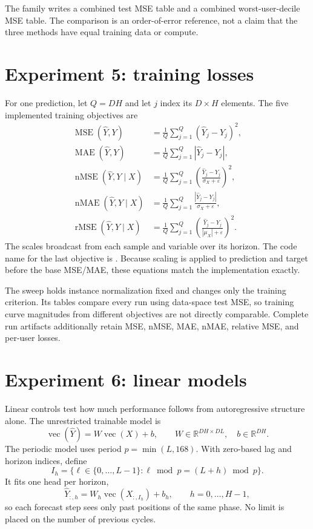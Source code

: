 \documentclass[10pt]{article}
\newcommand{\reals}{\mathbb{R}}
\newcommand{\code}[1]{\texttt{\detokenize{#1}}}
\newcommand{\MSE}{\operatorname{MSE}}
\newcommand{\MAE}{\operatorname{MAE}}
\newcommand{\nMSE}{\operatorname{nMSE}}
\newcommand{\nMAE}{\operatorname{nMAE}}
\newcommand{\rMSE}{\operatorname{rMSE}}
\begin{document}
The family writes a combined test MSE table and a combined worst-user-decile
MSE table. The comparison is an order-of-error reference, not a claim that the
three methods have equal training data or compute.

\section{Experiment 5: training losses}
\label{sec:losses}

For one prediction, let $Q=DH$ and let $j$ index its $D\times H$ elements. The
five implemented training objectives are
\begin{align}
  \MSE(\widehat Y,Y)
  &=\frac1Q\sum_{j=1}^{Q}(\widehat Y_j-Y_j)^2,\\
  \MAE(\widehat Y,Y)
  &=\frac1Q\sum_{j=1}^{Q}|\widehat Y_j-Y_j|,\\
  \nMSE(\widehat Y,Y\mid X)
  &=\frac1Q\sum_{j=1}^{Q}
    \left(\frac{\widehat Y_j-Y_j}{\sigma_X+\varepsilon}\right)^2,\\
  \nMAE(\widehat Y,Y\mid X)
  &=\frac1Q\sum_{j=1}^{Q}
    \frac{|\widehat Y_j-Y_j|}{\sigma_X+\varepsilon},\\
  \rMSE(\widehat Y,Y\mid X)
  &=\frac1Q\sum_{j=1}^{Q}
    \left(\frac{\widehat Y_j-Y_j}{|\mu_X|+\varepsilon}\right)^2.
\end{align}
The scales broadcast from each sample and variable over its horizon. The code
name for the last objective is \code{relative_mse}. Because scaling is applied
to prediction and target before the base MSE/MAE, these equations match the
implementation exactly.

The sweep holds instance normalization fixed and changes only the training
criterion. Its tables compare every run using data-space test MSE, so training
curve magnitudes from different objectives are not directly comparable.
Complete run artifacts additionally retain MSE, nMSE, MAE, nMAE, relative MSE,
and per-user losses.

\section{Experiment 6: linear models}
\label{sec:linear}

Linear controls test how much performance follows from autoregressive structure
alone. The unrestricted trainable model is
\[
  \operatorname{vec}(\widehat Y)
  =W\operatorname{vec}(X)+b,
  \qquad W\in\reals^{DH\times DL},\quad b\in\reals^{DH}.
\]
The periodic model uses period $p=\min(L,168)$. With zero-based lag and horizon
indices, define
\[
  I_h=\{\ell\in\{0,\ldots,L-1\}:\ell\bmod p=(L+h)\bmod p\}.
\]
It fits one head per horizon,
\[
  \widehat Y_{:,h}=W_h\operatorname{vec}(X_{:,I_h})+b_h,
  \qquad h=0,\ldots,H-1,
\]
so each forecast step sees only past positions of the same phase. No limit is
placed on the number of previous cycles.
\end{document}
